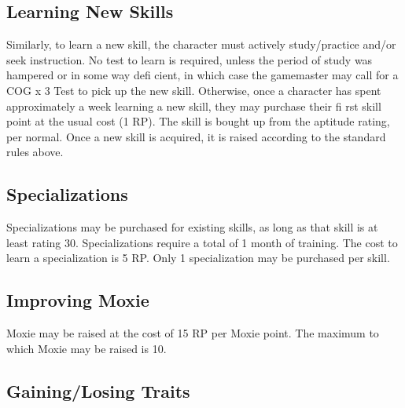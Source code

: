\subsection{Learning New Skills}
\label{sec:learning-new-skills}

Similarly, to learn a new skill, the character must actively study/practice and/or seek instruction. No test to learn is required, unless the period of study was hampered or in some way defi cient, in which case the gamemaster may call for a COG x 3 Test to pick up the new skill. Otherwise, once a character has spent approximately a week learning a new skill, they may purchase their fi rst skill point at the usual cost (1 RP). The skill is bought up from the aptitude rating, per normal. Once a new skill is acquired, it is raised according to the standard rules above.

\subsection{Specializations}
\label{sec:new-specializations}
Specializations may be purchased for existing skills, as long as that skill is at least rating 30. Specializations require a total of 1 month of training. The cost to learn a specialization is 5 RP. Only 1 specialization may be purchased per skill.

\subsection{Improving Moxie}
\label{sec:improving-moxie}

Moxie may be raised at the cost of 15 RP per Moxie point. The maximum to which Moxie may be raised is 10.

\subsection{Gaining/Losing Traits}
\label{sec:gaining-losing-traits}

